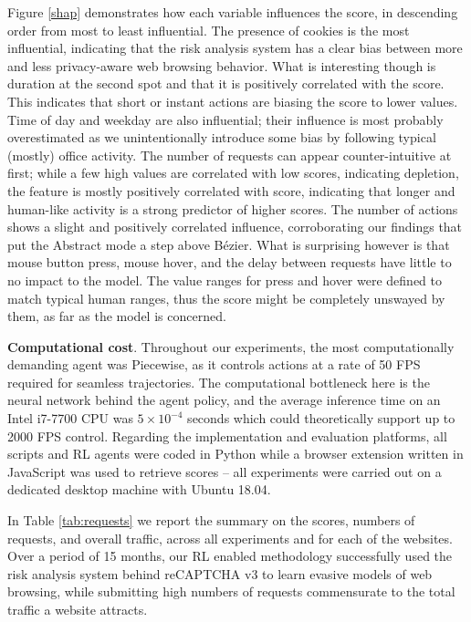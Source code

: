 Figure \ref{shap} demonstrates how each variable influences the score, in descending order from most to least influential.
The presence of cookies is the most influential, indicating that the risk analysis system has a clear bias between more and less privacy-aware web browsing behavior.
What is interesting though is duration at the second spot and that it is positively correlated with the score.
This indicates that short or instant actions are biasing the score to lower values.
Time of day and weekday are also influential; their influence is most probably overestimated as we unintentionally introduce some bias by following typical (mostly) office activity.
The number of requests can appear counter-intuitive at first; while a few high values are correlated with low scores, indicating depletion, the feature is mostly positively correlated with score, indicating that longer and human-like activity is a strong predictor of higher scores.
The number of actions shows a slight and positively correlated influence, corroborating our findings that put the Abstract mode a step above Bézier.
What is surprising however is that mouse button press, mouse hover, and the delay between requests have little to no impact to the model.
The value ranges for press and hover were defined to match typical human ranges, thus the score might be completely unswayed by them, as far as the model is concerned.

\textbf{Computational cost}. Throughout our experiments, the most computationally demanding agent was Piecewise, as it controls actions at a rate of 50 FPS required for seamless trajectories.
The computational bottleneck here is the neural network behind the agent policy, and the average inference time on an Intel i7-7700 CPU was $5 \times 10^{-4}$ seconds which could theoretically support up to 2000 FPS control.
Regarding the implementation and evaluation platforms, all scripts and \gls{RL} agents were coded in Python while a browser extension written in JavaScript was used to retrieve scores -- all experiments were carried out on a dedicated desktop machine with Ubuntu 18.04.

In Table \ref{tab:requests} we report the summary on the scores, numbers of requests, and overall traffic, across all experiments and for each of the websites.
Over a period of 15 months, our \gls{RL} enabled methodology successfully used the risk analysis system behind reCAPTCHA v3 to learn evasive models of web browsing, while submitting high numbers of requests commensurate to the total traffic a website attracts.

